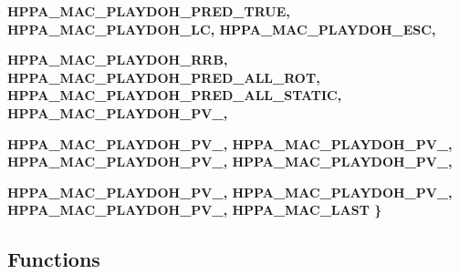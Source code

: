 \begin{CompactItemize}
\bf{HPPA\_\-MAC\_\-PLAYDOH\_\-PRED\_\-TRUE}, 
\bf{HPPA\_\-MAC\_\-PLAYDOH\_\-LC}, 
\bf{HPPA\_\-MAC\_\-PLAYDOH\_\-ESC}, 
\par
\bf{HPPA\_\-MAC\_\-PLAYDOH\_\-RRB}, 
\bf{HPPA\_\-MAC\_\-PLAYDOH\_\-PRED\_\-ALL\_\-ROT}, 
\bf{HPPA\_\-MAC\_\-PLAYDOH\_\-PRED\_\-ALL\_\-STATIC}, 
\bf{HPPA\_\-MAC\_\-PLAYDOH\_\-PV\_}, 
\par
\bf{HPPA\_\-MAC\_\-PLAYDOH\_\-PV\_}, 
\bf{HPPA\_\-MAC\_\-PLAYDOH\_\-PV\_}, 
\bf{HPPA\_\-MAC\_\-PLAYDOH\_\-PV\_}, 
\bf{HPPA\_\-MAC\_\-PLAYDOH\_\-PV\_}, 
\par
\bf{HPPA\_\-MAC\_\-PLAYDOH\_\-PV\_}, 
\bf{HPPA\_\-MAC\_\-PLAYDOH\_\-PV\_}, 
\bf{HPPA\_\-MAC\_\-PLAYDOH\_\-PV\_}, 
\bf{HPPA\_\-MAC\_\-LAST}
 \}
\end{CompactItemize}
\subsection*{Functions}

